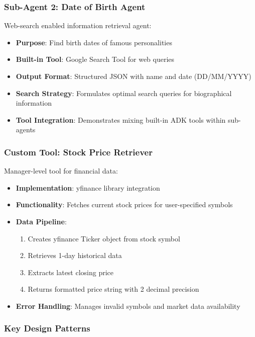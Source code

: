 \documentclass[12pt,a4paper]{article}
\begin{document}
\subsubsection{Sub-Agent 2: Date of Birth Agent}

Web-search enabled information retrieval agent:
\begin{itemize}
    \item \textbf{Purpose}: Find birth dates of famous personalities
    \item \textbf{Built-in Tool}: Google Search Tool for web queries
    \item \textbf{Output Format}: Structured JSON with name and date (DD/MM/YYYY)
    \item \textbf{Search Strategy}: Formulates optimal search queries for biographical information
    \item \textbf{Tool Integration}: Demonstrates mixing built-in ADK tools within sub-agents
\end{itemize}

\subsubsection{Custom Tool: Stock Price Retriever}

Manager-level tool for financial data:
\begin{itemize}
    \item \textbf{Implementation}: yfinance library integration
    \item \textbf{Functionality}: Fetches current stock prices for user-specified symbols
    \item \textbf{Data Pipeline}:
    \begin{enumerate}
        \item Creates yfinance Ticker object from stock symbol
        \item Retrieves 1-day historical data
        \item Extracts latest closing price
        \item Returns formatted price string with 2 decimal precision
    \end{enumerate}
    \item \textbf{Error Handling}: Manages invalid symbols and market data availability
\end{itemize}

\subsubsection{Key Design Patterns}
\end{document}
